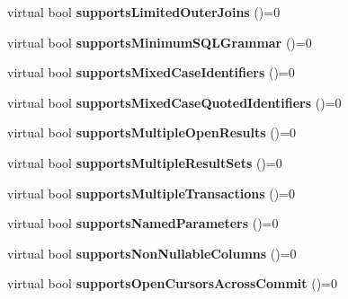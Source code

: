 \begin{DoxyCompactItemize}
virtual bool {\bfseries supports\+Limited\+Outer\+Joins} ()=0
\item 
\hypertarget{classsql_1_1_database_meta_data_a653b7d0458e2f1b373690ebd507c551b}{}\label{classsql_1_1_database_meta_data_a653b7d0458e2f1b373690ebd507c551b} 
virtual bool {\bfseries supports\+Minimum\+S\+Q\+L\+Grammar} ()=0
\item 
\hypertarget{classsql_1_1_database_meta_data_acbcd48e99ceacffde58b6260d65113f7}{}\label{classsql_1_1_database_meta_data_acbcd48e99ceacffde58b6260d65113f7} 
virtual bool {\bfseries supports\+Mixed\+Case\+Identifiers} ()=0
\item 
\hypertarget{classsql_1_1_database_meta_data_acb22ff50b93fe8b5eff5558010389060}{}\label{classsql_1_1_database_meta_data_acb22ff50b93fe8b5eff5558010389060} 
virtual bool {\bfseries supports\+Mixed\+Case\+Quoted\+Identifiers} ()=0
\item 
\hypertarget{classsql_1_1_database_meta_data_af6fbf8b68fafede0188f19ccfb30bcf2}{}\label{classsql_1_1_database_meta_data_af6fbf8b68fafede0188f19ccfb30bcf2} 
virtual bool {\bfseries supports\+Multiple\+Open\+Results} ()=0
\item 
\hypertarget{classsql_1_1_database_meta_data_a141976e4d54b6e15e66f7d66c4842de0}{}\label{classsql_1_1_database_meta_data_a141976e4d54b6e15e66f7d66c4842de0} 
virtual bool {\bfseries supports\+Multiple\+Result\+Sets} ()=0
\item 
\hypertarget{classsql_1_1_database_meta_data_acfa70abea67ad72206a042d007a4adbc}{}\label{classsql_1_1_database_meta_data_acfa70abea67ad72206a042d007a4adbc} 
virtual bool {\bfseries supports\+Multiple\+Transactions} ()=0
\item 
\hypertarget{classsql_1_1_database_meta_data_a17df07b5807e6b086be00ea3c3ed0877}{}\label{classsql_1_1_database_meta_data_a17df07b5807e6b086be00ea3c3ed0877} 
virtual bool {\bfseries supports\+Named\+Parameters} ()=0
\item 
\hypertarget{classsql_1_1_database_meta_data_acfbff0416be9d701c6fb83b353316309}{}\label{classsql_1_1_database_meta_data_acfbff0416be9d701c6fb83b353316309} 
virtual bool {\bfseries supports\+Non\+Nullable\+Columns} ()=0
\item 
\hypertarget{classsql_1_1_database_meta_data_ab0f7fdfc34ad55dea2a1b545dcbc478c}{}\label{classsql_1_1_database_meta_data_ab0f7fdfc34ad55dea2a1b545dcbc478c} 
virtual bool {\bfseries supports\+Open\+Cursors\+Across\+Commit} ()=0
\item 
\hypertarget{classsql_1_1_database_meta_data_a6e40bb737eb74cb517b2233fed422453}{}\label{classsql_1_1_database_meta_data_a6e40bb737eb74cb517b2233fed422453} 

\end{DoxyCompactItemize}
